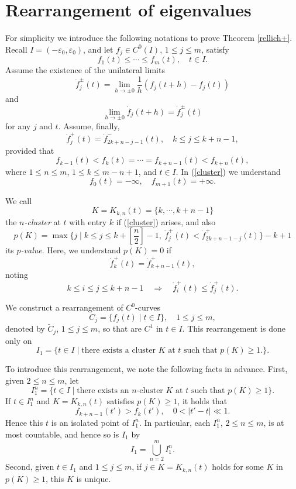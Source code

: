 \documentclass[final,a4paper]{jmsj}
\theoremstyle{thmstyleone}%
\theoremstyle{thmstyletwo}%
\theoremstyle{thmstylethree}%
\begin{document}
\section{Rearrangement of eigenvalues}\label{sec:rearrange}

For simplicity we introduce the following notations to prove Theorem \ref{rellich+}. Recall $I=(-\varepsilon_0, \varepsilon_0)$, and let $f_j\in C^0(I)$, $1\leq j\leq m$, satisfy  
\begin{equation} 
f_1(t)\leq \cdots \leq f_m(t), \quad t\in I. 
 \label{p0}
\end{equation} 
Assume the existence of the unilateral limits 
\begin{equation} 
\dot f_j^\pm(t)=\lim_{h\rightarrow \pm 0}\frac{1}{h}(f_j(t+h)-f_j(t)) 
 \label{p1}
\end{equation} 
and 
\begin{equation} 
\lim_{h\rightarrow \pm 0}\dot f_j(t+h)=\dot f_j^\pm(t) 
 \label{p2}
\end{equation} 
for any $j$ and $t$. Assume, finally, 
\begin{equation} 
\dot f_j^+(t)=\dot f_{2k+n-j-1}^-(t), \quad k\leq j\leq k+n-1,  
 \label{p3}
\end{equation} 
provided that 
\begin{equation} 
f_{k-1}(t)<f_k(t)=\cdots = f_{k+n-1}(t)<f_{k+n}(t),  
 \label{cluster}
\end{equation}
where $1\leq n\leq m$, $1\leq k\leq m-n+1$, and $t\in I$. 
In (\ref{cluster}) we understand 
\[ f_0(t)=-\infty, \quad f_{m+1}(t)=+\infty. \]  

We call 
\[ K=K_{k,n}(t)=\{ k, \cdots, k+n-1\} \] 
the {\it $n$-cluster} at $t$ with entry $k$ if (\ref{cluster}) arises, and also   
\[ p(K)=\max\{ j \mid k\leq j\leq k+[\frac{n}{2}]-1, \ \dot f_j^+(t)<\dot f_{2k+n-1-j}^+(t)\} -k+1  \] 
its {\it $p$-value}. Here, we understand $p(K)=0$ if 
\[ \dot f_k^+(t)=\dot f_{k+n-1}^+(t), \] 
noting 
\[ k\leq i\leq j\leq k+n-1 \quad \Rightarrow \quad \dot f_i^+(t)\leq \dot f_j^+(t). \]   

We construct a rearrangement of $C^0$-curves
\[ C_j=\{ f_j(t) \mid t\in I\}, \quad 1\leq j\leq m,  \] 
denoted by $\tilde C_j$, $1\leq j\leq m$, so that are $C^1$ in $t\in I$.  This rearrangement is done only on 
\[ I_1=\{ t\in I \mid \mbox{there exists a cluster $K$ at $t$ such that $p(K)\geq 1$}.\}. \] 

To introduce this rearrangement, we note the following facts in advance. First, given $2\leq n\leq m$, let    
\[ I_1^n=\{ t\in I \mid \mbox{there exists an $n$-cluster $K$ at $t$ such that $p(K)\geq 1$}\}.  \] 
If $t\in I_1^n$ and $K=K_{k,n}(t)$ satisfies $p(K)\geq 1$, it holds that 
\begin{equation} 
f_{k+n-1}(t')>f_k(t'), \quad 0<\vert t'-t\vert \ll 1.  
 \label{bunretsu}
\end{equation} 
Hence this $t$ is an isolated point of $I_1^n$. In particular, each $I_1^n$, $2\leq n\leq m$, is at most countable, and hence so is $I_1$ by   
\[ I_1=\bigcup_{n=2}^mI_1^n. \] 
Second, given $t\in I_1$ and $1\leq j\leq m$, if $j\in K=K_{k,n}(t)$ holds for some $K$ in $p(K)\geq 1$, this $K$ is unique.  
\end{document}
